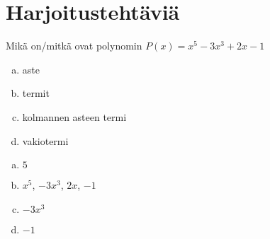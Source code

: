 
\section{Harjoitustehtäviä}
\begin{tehtava}
	Mikä on/mitkä ovat polynomin $P(x) = x^5-3x^3+2x-1$
	\begin{enumerate}[a)]
		\item aste
		\item termit
		\item kolmannen asteen termi
		\item vakiotermi
	\end{enumerate}

	\begin{vastaus}
		\begin{enumerate}[a)]
			\item $5$
			\item $x^5$, $-3x^3$, $2x$, $-1$
			\item $-3x^3$
			\item $-1$
		\end{enumerate}
	\end{vastaus}
\end{tehtava}


